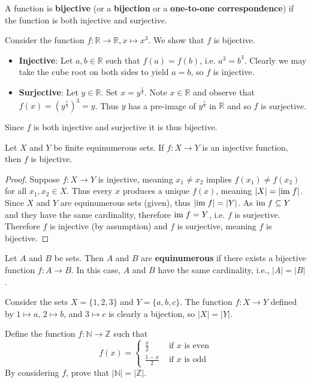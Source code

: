 \begin{definition}
    A function is \textbf{bijective} (or a \textbf{bijection} or a \textbf{one-to-one correspondence}) if the function is both injective and surjective.
\end{definition}
\begin{example}
    Consider the function $f: \mathbb{R} \to \mathbb{R}, x \mapsto x^3$. We show that $f$ is bijective.
    \begin{itemize}
        \item \textbf{Injective}: Let $a, b \in \mathbb{R}$ such that $f(a) = f(b)$, i.e. $a^3 = b^3$. Clearly we may take the cube root on both sides to yield $a = b$, so $f$ is injective.
        \item \textbf{Surjective}: Let $y \in \mathbb{R}$. Set $x=y^{\frac13}$. Note $x \in \mathbb{R}$ and observe that $f(x) = \left(y^{\frac13}\right)^3 = y$. Thus $y$ has a pre-image of $y^{\frac13}$ in $\mathbb{R}$ and so $f$ is surjective.
    \end{itemize}
    Since $f$ is both injective and surjective it is thus bijective.
\end{example}

\begin{proposition}
    Let $X$ and $Y$ be finite equinumerous sets. If $f: X \to Y$ is an injective function, then $f$ is bijective.
\end{proposition}
\begin{proof}
    Suppose $f: X \to Y$ is injective, meaning $x_1 \neq x_2$ implies $f(x_1) \neq f(x_2)$ for all $x_1, x_2 \in X$. Thus every $x$ produces a unique $f(x)$, meaning $|X| = |\mathrm{im}\; f|$. Since $X$ and $Y$ are equinumerous sets (given), thus $|\mathrm{im}\; f| = |Y|$. As $\mathrm{im}\; f \subseteq Y$ and they have the same cardinality, therefore $\mathrm{im}\; f = Y$, i.e. $f$ is surjective. Therefore $f$ is injective (by assumption) and $f$ is surjective, meaning $f$ is bijective.
\end{proof}

\begin{definition}
    Let $A$ and $B$ be sets. Then $A$ and $B$ are \textbf{equinumerous} if there exists a bijective function $f: A \to B$. In this case, $A$ and $B$ have the same cardinality, i.e., $|A| = |B|$.
\end{definition}
\begin{example}
    Consider the sets $X = \{1, 2, 3\}$ and $Y = \{a, b, c\}$. The function $f: X \to Y$ defined by $1 \mapsto a$, $2 \mapsto b$, and $3 \mapsto c$ is clearly a bijection, so $|X| = |Y|$.
\end{example}
\begin{exercise}
    Define the function $f: \mathbb{N} \to \mathbb{Z}$ such that
    \[
        f(x) = \begin{cases}
            \frac{x}{2} & \text{ if } x \text{ is even}\\
            \frac{1-x}{2} & \text{ if } x \text{ is odd} 
        \end{cases}
    \]
    By considering $f$, prove that $|\mathbb{N}| = |\mathbb{Z}|$.
\end{exercise}

